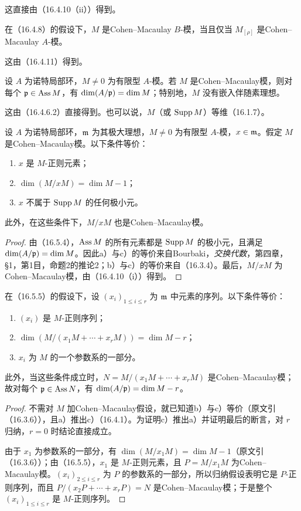 这直接由（16.4.10（ii））得到。

在（16.4.8）的假设下，$M$ 是Cohen--Macaulay $B$-模，当且仅当 $M_{[\rho]}$ 是Cohen--Macaulay $A$-模。

这由（16.4.11）得到。

设 $A$ 为诺特局部环，$M\ne0$ 为有限型 $A$-模。若 $M$ 是Cohen--Macaulay模，则对每个 $\mathfrak p\in\operatorname{Ass} M$，有 $\dim(A/\mathfrak p)=\dim M$；特别地，$M$ 没有嵌入伴随素理想。

这由（16.4.6.2）直接得到。也可以说，$M$（或 $\operatorname{Supp} M$）等维（16.1.7）。

设 $A$ 为诺特局部环，$\mathfrak m$ 为其极大理想，$M\ne0$ 为有限型 $A$-模，$x\in\mathfrak m$。假定 $M$ 是Cohen--Macaulay模。以下条件等价：
\begin{enumerate}[label=\alph*)]
 \item $x$ 是 $M$-正则元素；
 \item $\dim(M/xM)=\dim M-1$；
 \item $x$ 不属于 $\operatorname{Supp} M$ 的任何极小元。
\end{enumerate}
此外，在这些条件下，$M/xM$ 也是Cohen--Macaulay模。
\begin{proof}
由（16.5.4），$\operatorname{Ass} M$ 的所有元素都是 $\operatorname{Supp} M$ 的极小元，且满足 $\dim(A/\mathfrak p)=\dim M$。因此a）与c）的等价来自Bourbaki，\textit{交换代数}，第四章，§1，第1目，命题2的推论2；b）与c）的等价来自（16.3.4）。最后，$M/xM$ 为Cohen--Macaulay模，由（16.4.10（i））得到。
\end{proof}

在（16.5.5）的假设下，设 $(x_i)_{1\leq i\leq r}$ 为 $\mathfrak m$ 中元素的序列。以下条件等价：
\begin{enumerate}[label=\alph*)]
 \item $(x_i)$ 是 $M$-正则序列；
 \item $\dim(M/(x_1M+\cdots+x_rM))=\dim M-r$；
 \item $x_i$ 为 $M$ 的一个参数系的一部分。
\end{enumerate}
此外，当这些条件成立时，$N=M/(x_1M+\cdots+x_rM)$ 是Cohen--Macaulay模；故对每个 $\mathfrak p\in\operatorname{Ass} N$，有 $\dim(A/\mathfrak p)=\dim M-r$。
\begin{proof}
不需对 $M$ 加Cohen--Macaulay假设，就已知道b）与c）等价（原文引（16.3.6）），且a）推出c）（16.4.1）。为证明c）推出a）并证明最后的断言，对 $r$ 归纳，$r=0$ 时结论直接成立。

由于 $x_1$ 为参数系的一部分，有 $\dim(M/x_1M)=\dim M-1$（原文引（16.3.6））；由（16.5.5），$x_1$ 是 $M$-正则元素，且 $P=M/x_1M$ 为Cohen--Macaulay模。$(x_i)_{2\leq i\leq r}$ 为 $P$ 的参数系的一部分，所以归纳假设表明它是 $P$-正则序列，而且 $P/(x_2P+\cdots+x_rP)=N$ 是Cohen--Macaulay模；于是整个 $(x_i)_{1\leq i\leq r}$ 是 $M$-正则序列。
\end{proof}

